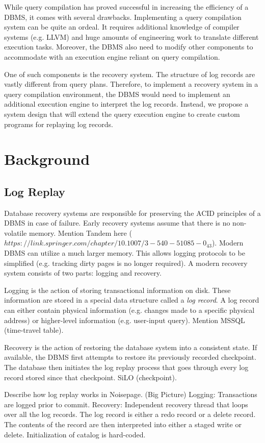 \documentclass[12pt]{cmuthesis}
\begin{document}
While query compilation has proved successful in increasing the efficiency of a DBMS, it comes with several drawbacks. Implementing a query compilation system can be quite an ordeal. It requires additional knowledge of compiler systems (e.g. LLVM) and huge amounts of engineering work to translate different execution tasks. Moreover, the DBMS also need to modify other components to accommodate with an execution engine reliant on query compilation.

One of such components is the recovery system. The structure of log records are vastly different from query plans. Therefore, to implement a recovery system in a query compilation environment, the DBMS would need to implement an additional execution engine to interpret the log records. Instead, we propose a system design that will extend the query execution engine to create custom programs for replaying log records.

\chapter{Background}
\section{Log Replay}
Database recovery systems are responsible for preserving the ACID principles of a DBMS in case of failure. Early recovery systems assume that there is no non-volatile memory. Mention Tandem here ($https://link.springer.com/chapter/10.1007/3-540-51085-0_43$). Modern DBMS can utilize a much larger memory. This allows logging protocols to be simplified (e.g. tracking dirty pages is no longer required). A modern recovery system consists of two parts: logging and recovery.

Logging is the action of storing transactional information on disk. These information are stored in a special data structure called a \textit{log record}. A log record can either contain physical information (e.g. changes made to a specific physical address) or higher-level information (e.g. user-input query). Mention MSSQL (time-travel table).

Recovery is the action of restoring the database system into a consistent state. If available, the DBMS first attempts to restore its previously recorded checkpoint. The database then initiates the log replay process that goes through every log record stored since that checkpoint. SiLO (checkpoint).

Describe how log replay works in Noisepage. (Big Picture)
Logging: Transactions are logged prior to commit.
Recovery: Independent recovery thread that loops over all the log records. The log record is either a redo record or a delete record. The contents of the record are then interpreted into either a staged write or delete. Initialization of catalog is hard-coded.
\end{document}
